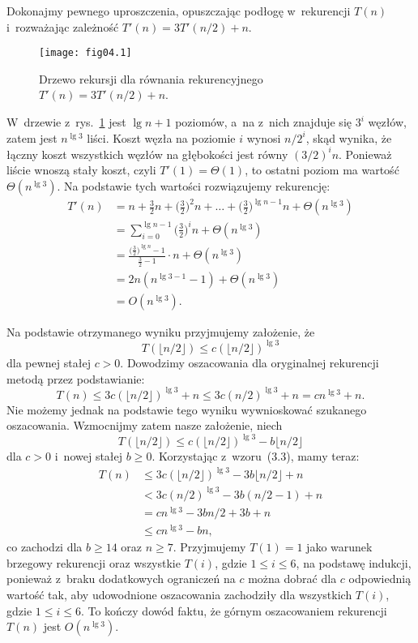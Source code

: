 
\exercise %
Dokonajmy pewnego uproszczenia, opuszczając podłogę w~rekurencji $T(n)$ i~rozważając zależność $T'(n)=3T'(n/2)+n$.
\begin{figure}[ht]
	\begin{center}
		\texttt{[image: fig04.1]}
	\end{center}
	\caption{Drzewo rekursji dla równania rekurencyjnego $T'(n)=3T'(n/2)+n$.} \label{fig:4.2-1}
\end{figure}
W~drzewie z~rys.~\ref{fig:4.2-1} jest $\lg n+1$ poziomów, a~na  z~nich znajduje się $3^i$ węzłów, zatem jest $n^{\lg3}$ liści. Koszt węzła na poziomie $i$ wynosi $n/2^i$, skąd wynika, że łączny koszt wszystkich węzłów na  głębokości jest równy $(3/2)^in$. Ponieważ liście wnoszą stały koszt, czyli $T'(1)=\Theta(1)$, to ostatni poziom ma wartość $\Theta(n^{\lg3})$. Na podstawie tych wartości rozwiązujemy rekurencję:
\begin{align*}
	T'(n) &= n+\frac{3}{2}n+\biggl(\frac{3}{2}\biggr)^2n+\dots+\biggl(\frac{3}{2}\biggr)^{\lg n-1}n+\Theta(n^{\lg3}) \\
	&= \sum_{i=0}^{\lg n-1}\biggl(\frac{3}{2}\biggr)^in+\Theta(n^{\lg3}) \\
	&= \frac{\bigl(\frac{3}{2}\bigr)^{\lg n}-1}{\frac{3}{2}-1}\cdot n+\Theta(n^{\lg3}) \\[1mm]
	&= 2n(n^{\lg3-1}-1)+\Theta(n^{\lg3}) \\
	&= O(n^{\lg3}).
\end{align*}

Na podstawie otrzymanego wyniku przyjmujemy założenie, że
\[
    T(\lfloor n/2\rfloor)\le c(\lfloor n/2\rfloor)^{\lg3}
\]
dla pewnej stałej $c>0$. Dowodzimy oszacowania dla oryginalnej rekurencji metodą przez podstawianie:
\[
	T(n) \le 3c(\lfloor n/2\rfloor)^{\lg3}+n \le 3c(n/2)^{\lg3}+n = cn^{\lg3}+n.
\]
Nie możemy jednak na podstawie tego wyniku wywnioskować szukanego oszacowania. Wzmocnijmy zatem nasze założenie, niech
\[
	T(\lfloor n/2\rfloor) \le c(\lfloor n/2\rfloor)^{\lg3}-b\lfloor n/2\rfloor
\]
dla $c>0$ i~nowej stałej $b\ge0$. Korzystając z~wzoru~(3.3), mamy teraz:
\begin{align*}
	T(n) &\le 3c(\lfloor n/2\rfloor)^{\lg3}-3b\lfloor n/2\rfloor+n \\
	&< 3c(n/2)^{\lg3}-3b(n/2-1)+n \\
	&= cn^{\lg3}-3bn/2+3b+n \\
	&\le cn^{\lg3}-bn,
\end{align*}
co zachodzi dla $b\ge14$ oraz $n\ge7$. Przyjmujemy $T(1)=1$ jako warunek brzegowy rekurencji oraz wszystkie $T(i)$, gdzie $1\le i\le6$, na podstawę indukcji, ponieważ z~braku dodatkowych ograniczeń na $c$ można dobrać dla $c$ odpowiednią wartość tak, aby udowodnione oszacowania zachodziły dla wszystkich $T(i)$, gdzie $1\le i\le6$. To kończy dowód faktu, że górnym oszacowaniem rekurencji $T(n)$ jest $O(n^{\lg3})$.

